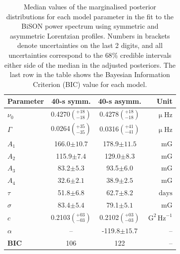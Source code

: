 \vspace{1em}

\begin{table}[ht!]
	\begin{center}
		\caption{Median values of the marginalised posterior distributions for each model parameter in the fit to the BiSON power spectrum using symmetric and asymmetric Lorentzian profiles. Numbers in brackets denote uncertainties on the last 2 digits, and all uncertainties correspond to the $68 \%$ credible intervals either side of the median in the adjusted posteriors. The last row in the table shows the Bayesian Information Criterion (BIC) value for each model.}
		\label{tab:PSD_fit_params}
		\begin{tabular}{l c c r}
			\hline
			{\bf Parameter} & {\bf 40-s symm.} & {\bf 40-s asymm.} & {\bf Unit} \\
			\hline
			
			{$\nu_0$} & {0.4270$\left(_{-18}^{+18}\right)$} & {0.4278$\left(_{-18}^{+18}\right)$} & {$\upmu\mathrm{Hz} $}\\
			
			{$\Gamma$} & {0.0264$\left(_{-35}^{+35}\right)$} & {0.0316$\left(_{-41}^{+41}\right)$} & {$\upmu\mathrm{Hz} $} \\
			
			{$A_1$} & {166.0$\pm10.7 $} & {178.9$\pm 11.5$} & {$\mathrm{mG}$} \\
			
			{$A_2$} & {115.9$\pm7.4$} & {129.0$\pm 8.3$} & {$\mathrm{mG}$} \\
			
			{$A_3$} & {83.2$\pm5.3$} & {93.5$\pm 6.0$} & {$\mathrm{mG}$} \\
			
			{$A_4$} & {32.6$\pm2.1$} & {38.9$\pm 2.5$} &  {$\mathrm{mG}$} \\	
			
			{$\tau$} & {51.8$\pm6.8$} & {62.7$\pm8.2$} & {$\mathrm{days}$} \\	
			
			{$\sigma$} & {83.4$\pm5.4$} & {79.1$\pm5.1$} &  {$\mathrm{mG}$} \\	
			
			{$c$} & {0.2103$\left(_{-03}^{+03}\right)$} & {0.2102$\left(_{-03}^{+03}\right)$}  & {$\mathrm{G}^2 \, \mathrm{Hz}^{-1}$} \\	
			
			{$\alpha$} & {--} & {-119.8$\pm15.7$} & {--} \\	
			\hline
			{\bf BIC} & {106} & {122} & {--} \\
			\hline
		\end{tabular}
	\end{center}
\end{table}

